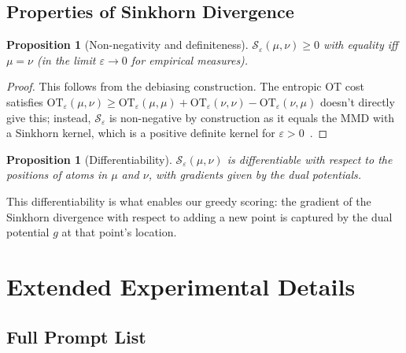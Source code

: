 \documentclass[10pt]{article}
\newtheorem{proposition}[theorem]{Proposition}
\begin{document}
\subsection{Properties of Sinkhorn Divergence}

\begin{proposition}[Non-negativity and definiteness]
$\mathcal{S}_\varepsilon(\mu, \nu) \geq 0$ with equality iff $\mu = \nu$ (in the limit $\varepsilon \to 0$ for empirical measures).
\end{proposition}

\begin{proof}
This follows from the debiasing construction. The entropic OT cost satisfies $\text{OT}_\varepsilon(\mu, \nu) \geq \text{OT}_\varepsilon(\mu, \mu) + \text{OT}_\varepsilon(\nu, \nu) - \text{OT}_\varepsilon(\nu, \mu)$ doesn't directly give this; instead, $\mathcal{S}_\varepsilon$ is non-negative by construction as it equals the MMD with a Sinkhorn kernel, which is a positive definite kernel for $\varepsilon > 0$~\citep{feydy2019interpolating}.
\end{proof}

\begin{proposition}[Differentiability]
$\mathcal{S}_\varepsilon(\mu, \nu)$ is differentiable with respect to the positions of atoms in $\mu$ and $\nu$, with gradients given by the dual potentials.
\end{proposition}

This differentiability is what enables our greedy scoring: the gradient of the Sinkhorn divergence with respect to adding a new point is captured by the dual potential $g$ at that point's location.

\section{Extended Experimental Details}
\label{app:exp-details}

\subsection{Full Prompt List}
\end{document}
